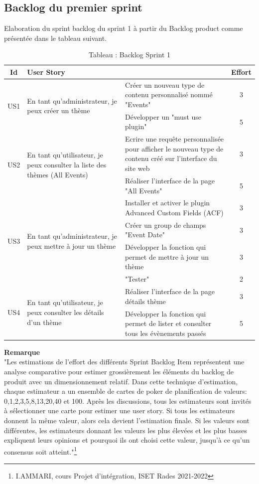 \subsection{Backlog du premier sprint}
Elaboration du sprint backlog du sprint 1 à partir du Backlog product comme présentée dans le
tableau suivant.
\newpage
\begin{table}[!h]
	\centering %
	\begin{tabular}{|c|p{5cm}|p{8cm}|c|}
		\hline
		\textbf{Id}&\textbf{User Story} & \centering{\textbf{Sprint Backlog Item}} & \textbf{Effort}\tabularnewline
		\hline
	 \multirow{2}{*}{US1}&\multirow{2}{4cm}{En tant qu'administrateur, je peux créer un thème }&Créer un nouveau type de contenu personnalisé nommé "Events"&3\\
	 \cline{3-4}
	 &&Développer un "must use plugin" &5\\
	 \hline
	  \multirow{2}{*}{US2}&\multirow{2}{4cm}{En tant qu'utilisateur, je peux consulter la liste des thèmes (All Events) }&Ecrire une requête personnalisée pour afficher le nouveau type de contenu créé sur l'interface du site web&3\\
	 \cline{3-4}
	 &&Réaliser l'interface de la page "All Events" &5\\
	 \hline
	  \multirow{4}{*}{US3}&\multirow{4}{4cm}{En tant qu'administrateur, je peux mettre à jour un thème }&Installer et activer le plugin Advanced Custom Fields (ACF)&3\\
	 \cline{3-4}
	  &&Créer un group de champs "Event Date" &3\\
	 \cline{3-4}
	 &&Développer la fonction qui permet de mettre à jour un thème &3\\
	 \cline{3-4}
	
	  &&"Tester" &2\\
	 \hline
	 \multirow{2}{*}{US4}&\multirow{2}{5cm}{En tant qu'utilisateur, je peux consulter les détails d'un thème} & Réaliser l'interface de la page détails thème &3\\
	 \cline{3-4}
	 &&Développer la fonction qui permet de lister et consulter tous les évènements passés &5\\
	 \hline
	 
	  
		
	\end{tabular}
	\caption{Tableau : Backlog Sprint 1}
\end{table}
\textbf{Remarque}\\
"Les estimations de l’effort des différents Sprint Backlog Item représentent une analyse
comparative pour estimer grossièrement les éléments du backlog de produit avec un
dimensionnement relatif.
Dans cette technique d'estimation, chaque estimateur a un ensemble de cartes de poker de
planification de valeurs: 0,1,2,3,5,8,13,20,40 et 100.
Après les discussions, tous les estimateurs sont invités à sélectionner une carte pour estimer
une user story. Si tous les estimateurs donnent la même valeur, alors cela devient
l'estimation finale.
Si les valeurs sont différentes, les estimateurs donnant les valeurs les plus élevées et les plus
basses expliquent leurs opinions et pourquoi ils ont choisi cette valeur, jusqu'à ce qu'un
consensus soit atteint."\footnote{I.AMMARI, cours Projet d’intégration, ISET Rades 2021-2022 }
